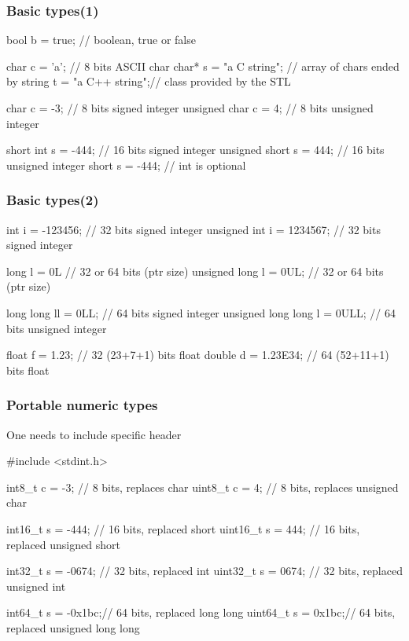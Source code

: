 \begin{frame}[fragile]
  \frametitle{Basic types(1)}
  \begin{cppcode}
    bool b = true;            // boolean, true or false
    
    char c = 'a';             // 8 bits ASCII char
    char* s = "a C string";   // array of chars ended by \0
    string t = "a C++ string";// class provided by the STL

    char c = -3;              // 8 bits signed integer
    unsigned char c = 4;      // 8 bits unsigned integer

    short int s = -444;       // 16 bits signed integer
    unsigned short s = 444;   // 16 bits unsigned integer
    short s = -444;           // int is optional
  \end{cppcode}
\end{frame}
\begin{frame}[fragile]
  \frametitle{Basic types(2)}
  \begin{cppcode}
    int i = -123456;          // 32 bits signed integer
    unsigned int i = 1234567; // 32 bits signed integer

    long l = 0L               // 32 or 64 bits (ptr size)
    unsigned long l = 0UL;    // 32 or 64 bits (ptr size)

    long long ll = 0LL;       // 64 bits signed integer
    unsigned long long l = 0ULL; // 64 bits unsigned integer

    float f = 1.23;           // 32 (23+7+1) bits float
    double d = 1.23E34;       // 64 (52+11+1) bits float
  \end{cppcode}
\end{frame}

\begin{frame}[fragile]
  \frametitle{Portable numeric types}
  \alert{One needs to include specific header}
  \begin{cppcode}
    #include <stdint.h>
    
    int8_t c = -3;     // 8 bits, replaces char
    uint8_t c = 4;     // 8 bits, replaces unsigned char

    int16_t s = -444;  // 16 bits, replaced short
    uint16_t s = 444;  // 16 bits, replaced unsigned short

    int32_t s = -0674; // 32 bits, replaced int
    uint32_t s = 0674; // 32 bits, replaced unsigned int

    int64_t s = -0x1bc;// 64 bits, replaced long long
    uint64_t s = 0x1bc;// 64 bits, replaced unsigned long long
    \end{cppcode}
\end{frame}


